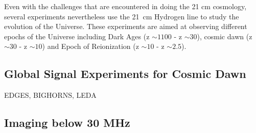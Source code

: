 \documentclass[12pt,a4paper]{report}
\begin{document}
	
	Even with the challenges that are encountered in doing the 21 cm cosmology, several experiments nevertheless use the \SI{21}{cm} Hydrogen line to study the evolution of the Universe. These experiments are aimed at observing different epochs of the Universe including Dark Ages (z $\sim1100$ - z $\sim30$), cosmic dawn (z $\sim30$ - z $\sim10$) and Epoch of Reionization (z $\sim10$ - z $\sim2.5$). \\
	
		
		\subsection{Global Signal Experiments for Cosmic Dawn}
		
		EDGES, BIGHORNS, LEDA
		
		\subsection{Imaging below 30 MHz}
	
\end{document}
